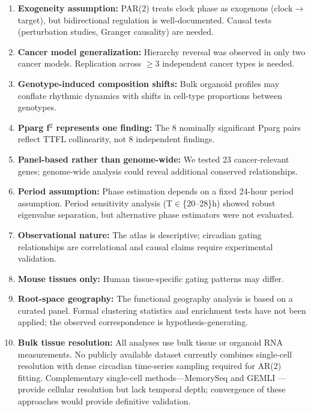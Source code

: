 \documentclass[11pt,a4paper]{article}
\begin{document}
\begin{enumerate}
    \item \textbf{Exogeneity assumption:} PAR(2) treats clock phase as exogenous (clock$\rightarrow$target), but bidirectional regulation is well-documented. Causal tests (perturbation studies, Granger causality) are needed.
    
    \item \textbf{Cancer model generalization:} Hierarchy reversal was observed in only two cancer models. Replication across $\geq$3 independent cancer types is needed.
    
    \item \textbf{Genotype-induced composition shifts:} Bulk organoid profiles may conflate rhythmic dynamics with shifts in cell-type proportions between genotypes.
    
    \item \textbf{Pparg f$^2$ represents one finding:} The 8 nominally significant Pparg pairs reflect TTFL collinearity, not 8 independent findings.
    
    \item \textbf{Panel-based rather than genome-wide:} We tested 23 cancer-relevant genes; genome-wide analysis could reveal additional conserved relationships.
    
    \item \textbf{Period assumption:} Phase estimation depends on a fixed 24-hour period assumption. Period sensitivity analysis (T$\in$\{20--28\}h) showed robust eigenvalue separation, but alternative phase estimators were not evaluated.
    
    \item \textbf{Observational nature:} The atlas is descriptive; circadian gating relationships are correlational and causal claims require experimental validation.
    
    \item \textbf{Mouse tissues only:} Human tissue-specific gating patterns may differ.
    
    \item \textbf{Root-space geography:} The functional geography analysis is based on a curated panel. Formal clustering statistics and enrichment tests have not been applied; the observed correspondence is hypothesis-generating.
    
    \item \textbf{Bulk tissue resolution:} All analyses use bulk tissue or organoid RNA measurements. No publicly available dataset currently combines single-cell resolution with dense circadian time-series sampling required for AR(2) fitting. Complementary single-cell methods---MemorySeq \citep{raj2020memoryseq} and GEMLI \citep{eisele2024gemli}---provide cellular resolution but lack temporal depth; convergence of these approaches would provide definitive validation.
    

\end{enumerate}
\end{document}

